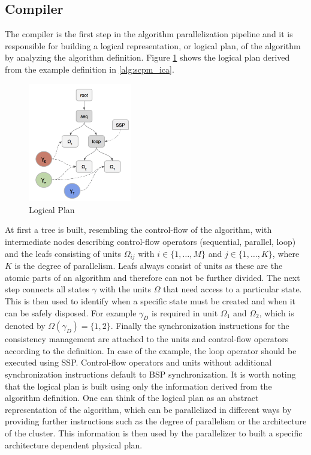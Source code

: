 \subsection{Compiler}
The compiler is the first step in the algorithm parallelization pipeline and it is responsible for building a logical representation, or logical plan, of the algorithm by analyzing the algorithm definition.
Figure \ref{fig:logical_plan} shows the logical plan derived from the example definition in \eqref{alg:scpm_ica}.
\begin{figure}[ht]
\centering
\includegraphics[width=0.4\textwidth]{img/logical_plan.png}
\caption{Logical Plan}
\label{fig:logical_plan}
\end{figure}
At first a tree is built, resembling the control-flow of the algorithm, with intermediate nodes describing control-flow operators (sequential, parallel, loop) and the leafs consisting of units $\Omega_{ij}$ with $i \in \{1, \ldots, M\}$ and $j \in \{1, \ldots, K\}$, where $K$ is the degree of parallelism.
Leafs always consist of units as these are the atomic parts of an algorithm and therefore can not be further divided.
The next step connects all states $\gamma$ with the units $\Omega$ that need access to a particular state.
This is then used to identify when a specific state must be created and when it can be safely disposed.
For example $\gamma_D$ is required in unit $\Omega_1$ and $\Omega_2$, which is denoted by $\Omega(\gamma_D) = \{1, 2\}$.
Finally the synchronization instructions for the consistency management are attached to the units and control-flow operators according to the definition.
In case of the example, the loop operator should be executed using SSP.
Control-flow operators and units without additional synchronization instructions default to BSP synchronization.
It is worth noting that the logical plan is built using only the information derived from the algorithm definition.
One can think of the logical plan as an abstract representation of the algorithm, which can be parallelized in different ways by providing further instructions such as the degree of parallelism or the architecture of the cluster.
This information is then used by the parallelizer to built a specific architecture dependent physical plan.

